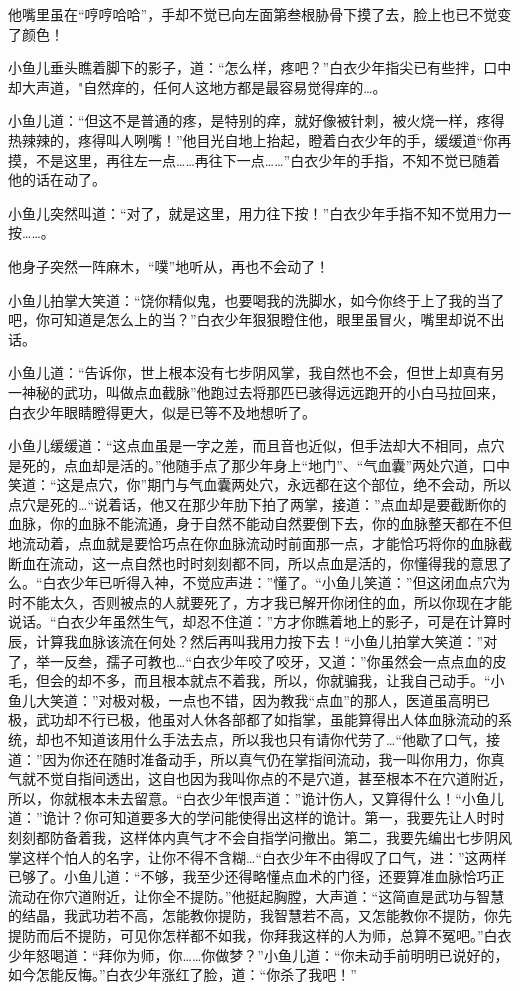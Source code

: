 \documentclass[12pt,oneside]{book}
\begin{document}
他嘴里虽在``哼哼哈哈''，手却不觉已向左面第叁根胁骨下摸了去，脸上也已不觉变了颜色！

小鱼儿垂头瞧着脚下的影子，道：``怎么样，疼吧？''白衣少年指尖已有些拌，口中却大声道，"自然痒的，任何人这地方都是最容易觉得痒的\ldots。

小鱼儿道：``但这不是普通的疼，是特别的痒，就好像被针刺，被火烧一样，疼得热辣辣的，疼得叫人咧嘴！''他目光自地上抬起，瞪着白衣少年的手，缓缓道``你再摸，不是这里，再往左一点\ldots\ldots 再往下一点\ldots\ldots{}''白衣少年的手指，不知不觉已随着他的话在动了。

小鱼儿突然叫道：``对了，就是这里，用力往下按！''白衣少年手指不知不觉用力一按\ldots\ldots。

他身子突然一阵麻木，``噗''地听从，再也不会动了！

小鱼儿拍掌大笑道：``饶你精似鬼，也要喝我的洗脚水，如今你终于上了我的当了吧，你可知道是怎么上的当？''白衣少年狠狠瞪住他，眼里虽冒火，嘴里却说不出话。

小鱼儿道：``告诉你，世上根本没有七步阴风掌，我自然也不会，但世上却真有另一神秘的武功，叫做点血截脉''他跑过去将那匹已骇得远远跑开的小白马拉回来，白衣少年眼睛瞪得更大，似是已等不及地想听了。

小鱼儿缓缓道：``这点血虽是一字之差，而且音也近似，但手法却大不相同，点穴是死的，点血却是活的。''他随手点了那少年身上``地门''、``气血囊''两处穴道，口中笑道：``这是点穴，你''期门与气血囊两处穴，永远都在这个部位，绝不会动，所以点穴是死的\ldots{}``说着话，他又在那少年肋下拍了两掌，接道：''点血却是要截断你的血脉，你的血脉不能流通，身于自然不能动自然要倒下去，你的血脉整天都在不但地流动着，点血就是要恰巧点在你血脉流动时前面那一点，才能恰巧将你的血脉截断血在流动，这一点自然也时时刻刻都不同，所以点血是活的，你懂得我的意思了么。``白衣少年已听得入神，不觉应声进：''懂了。``小鱼儿笑道：''但这闭血点穴为时不能太久，否则被点的人就要死了，方才我已解开你闭住的血，所以你现在才能说话。``白衣少年虽然生气，却忍不住道：''方才你瞧着地上的影子，可是在计算时辰，计算我血脉该流在何处？然后再叫我用力按下去！``小鱼儿拍掌大笑道：''对了，举一反叁，孺子可教也\ldots{}``白衣少年咬了咬牙，又道：''你虽然会一点点血的皮毛，但会的却不多，而且根本就点不着我，所以，你就骗我，让我自己动手。``小鱼儿大笑道：''对极对极，一点也不错，因为教我``点血''的那人，医道虽高明已极，武功却不行已极，他虽对人休各部都了如指掌，虽能算得出人体血脉流动的系统，却也不知道该用什么手法去点，所以我也只有请你代劳了\ldots{}``他歇了口气，接道：''因为你还在随时准备动手，所以真气仍在掌指间流动，我一叫你用力，你真气就不觉自指间透出，这自也因为我叫你点的不是穴道，甚至根本不在穴道附近，所以，你就根本未去留意。``白衣少年恨声道：''诡计伤人，又算得什么！``小鱼儿道：''诡计？你可知道要多大的学问能使得出这样的诡计。第一，我要先让人时时刻刻都防备着我，这样体内真气才不会自指学问撤出。第二，我要先编出七步阴风掌这样个怕人的名字，让你不得不含糊\ldots{}``白衣少年不由得叹了口气，进：''这两样已够了。小鱼儿道：``不够，我至少还得略懂点血术的门径，还要算准血脉恰巧正流动在你穴道附近，让你全不提防。''他挺起胸膛，大声道：``这简直是武功与智慧的结晶，我武功若不高，怎能教你提防，我智慧若不高，又怎能教你不提防，你先提防而后不提防，可见你怎样都不如我，你拜我这样的人为师，总算不冤吧。''白衣少年怒喝道：``拜你为师，你\ldots\ldots 你做梦？''小鱼儿道：``你未动手前明明已说好的，如今怎能反悔。''白衣少年涨红了脸，道：``你杀了我吧！''
\end{document}
